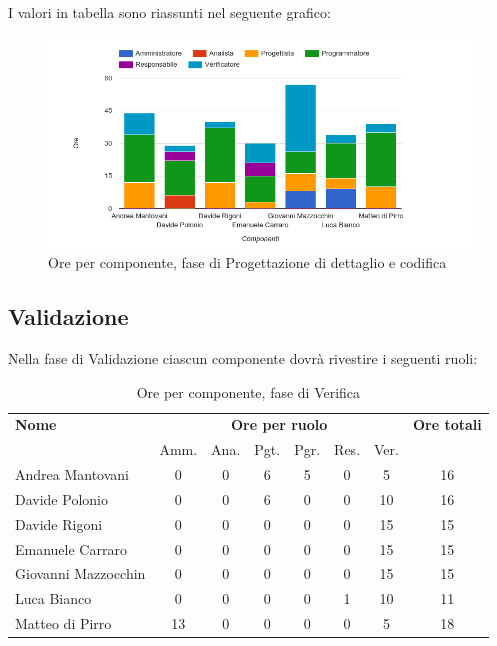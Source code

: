 I valori in tabella sono riassunti nel seguente grafico: \\ 

    \begin{figure}[H]
      \begin{center}
        \includegraphics[width=12cm]{res/img/orePerComponenteProgettazioneDettaglioCodifica.png}
      \caption{Ore per componente, fase di Progettazione di dettaglio e codifica}
      \end{center} 
    \end{figure}    
    
    
    
\pagebreak
\subsection{Validazione}
Nella fase di Validazione ciascun componente dovrà rivestire i seguenti ruoli:

\begin{table}[H]
\begin{tabular}{lccccccc}
\toprule
    \textbf{Nome}  & \multicolumn{6}{c}{\textbf{Ore per ruolo}} & \textbf{Ore totali} \\
     & Amm. & Ana. & Pgt. & Pgr. & Res. & Ver. & \\
    \midrule
    
	   Andrea Mantovani & 0 & 0 & 6 & 5 & 0 & 5 & 16 \\
	     Davide Polonio & 0 & 0 & 6 & 0 & 0 & 10 & 16 \\
	      Davide Rigoni & 0 & 0 & 0 & 0 & 0 & 15 & 15 \\
	   Emanuele Carraro & 0 & 0 & 0 & 0 & 0 & 15 & 15 \\
	Giovanni Mazzocchin & 0 & 0 & 0 & 0 & 0 & 15 & 15 \\
	        Luca Bianco & 0 & 0 & 0 & 0 & 1 & 10 & 11 \\
	    Matteo di Pirro & 13 & 0 & 0 & 0 & 0 & 5 & 18 \\
    
    \bottomrule
\end{tabular}
\caption{Ore per componente, fase di Verifica}
\end{table}

